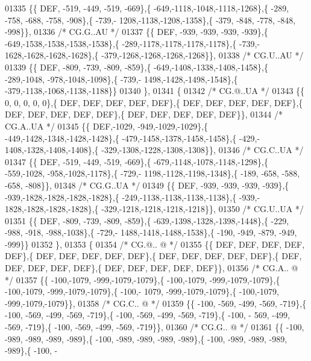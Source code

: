 \begin{DoxyCode}
01335 \{\{  DEF, -519, -449, -519, -669\},\{ -649,-1118,-1048,-1118,-1268\},\{ -289, -758, -688, -758, -908\},\{ -739,-
      1208,-1138,-1208,-1358\},\{ -379, -848, -778, -848, -998\}\},
01336 \textcolor{comment}{/* CG.G..AU */}
01337 \{\{  DEF, -939, -939, -939, -939\},\{ -649,-1538,-1538,-1538,-1538\},\{ -289,-1178,-1178,-1178,-1178\},\{ -739,-
      1628,-1628,-1628,-1628\},\{ -379,-1268,-1268,-1268,-1268\}\},
01338 \textcolor{comment}{/* CG.U..AU */}
01339 \{\{  DEF, -809, -739, -809, -859\},\{ -649,-1408,-1338,-1408,-1458\},\{ -289,-1048, -978,-1048,-1098\},\{ -739,-
      1498,-1428,-1498,-1548\},\{ -379,-1138,-1068,-1138,-1188\}\}
01340 \},
01341 \{
01342 \textcolor{comment}{/* CG.@..UA */}
01343 \{\{    0,    0,    0,    0,    0\},\{  DEF,  DEF,  DEF,  DEF,  DEF\},\{  DEF,  DEF,  DEF,  DEF,  DEF\},\{  DEF,  
      DEF,  DEF,  DEF,  DEF\},\{  DEF,  DEF,  DEF,  DEF,  DEF\}\},
01344 \textcolor{comment}{/* CG.A..UA */}
01345 \{\{  DEF,-1029, -949,-1029,-1029\},\{ -449,-1428,-1348,-1428,-1428\},\{ -479,-1458,-1378,-1458,-1458\},\{ -429,-
      1408,-1328,-1408,-1408\},\{ -329,-1308,-1228,-1308,-1308\}\},
01346 \textcolor{comment}{/* CG.C..UA */}
01347 \{\{  DEF, -519, -449, -519, -669\},\{ -679,-1148,-1078,-1148,-1298\},\{ -559,-1028, -958,-1028,-1178\},\{ -729,-
      1198,-1128,-1198,-1348\},\{ -189, -658, -588, -658, -808\}\},
01348 \textcolor{comment}{/* CG.G..UA */}
01349 \{\{  DEF, -939, -939, -939, -939\},\{ -939,-1828,-1828,-1828,-1828\},\{ -249,-1138,-1138,-1138,-1138\},\{ -939,-
      1828,-1828,-1828,-1828\},\{ -329,-1218,-1218,-1218,-1218\}\},
01350 \textcolor{comment}{/* CG.U..UA */}
01351 \{\{  DEF, -809, -739, -809, -859\},\{ -639,-1398,-1328,-1398,-1448\},\{ -229, -988, -918, -988,-1038\},\{ -729,-
      1488,-1418,-1488,-1538\},\{ -190, -949, -879, -949, -999\}\}
01352 \},
01353 \{
01354 \textcolor{comment}{/* CG.@.. @ */}
01355 \{\{  DEF,  DEF,  DEF,  DEF,  DEF\},\{  DEF,  DEF,  DEF,  DEF,  DEF\},\{  DEF,  DEF,  DEF,  DEF,  DEF\},\{  DEF,  
      DEF,  DEF,  DEF,  DEF\},\{  DEF,  DEF,  DEF,  DEF,  DEF\}\},
01356 \textcolor{comment}{/* CG.A.. @ */}
01357 \{\{ -100,-1079, -999,-1079,-1079\},\{ -100,-1079, -999,-1079,-1079\},\{ -100,-1079, -999,-1079,-1079\},\{ -100,-
      1079, -999,-1079,-1079\},\{ -100,-1079, -999,-1079,-1079\}\},
01358 \textcolor{comment}{/* CG.C.. @ */}
01359 \{\{ -100, -569, -499, -569, -719\},\{ -100, -569, -499, -569, -719\},\{ -100, -569, -499, -569, -719\},\{ -100, -
      569, -499, -569, -719\},\{ -100, -569, -499, -569, -719\}\},
01360 \textcolor{comment}{/* CG.G.. @ */}
01361 \{\{ -100, -989, -989, -989, -989\},\{ -100, -989, -989, -989, -989\},\{ -100, -989, -989, -989, -989\},\{ -100, -

\end{DoxyCode}
